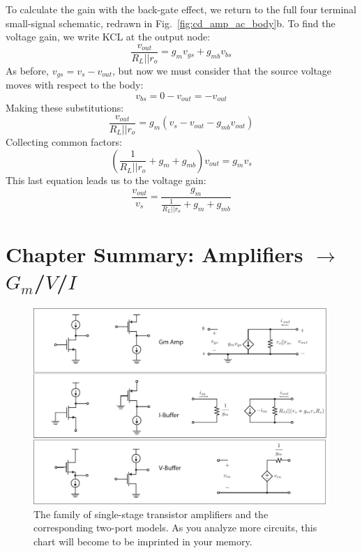 To calculate the gain with the back-gate effect, we return to the full four terminal small-signal schematic, redrawn in Fig.~\ref{fig:cd_amp_ac_body}b.  To find the voltage gain, we write KCL at the output node: 
% 
\begin{equation}
	\frac{{{v_{out}}}}{{{R_L}||{r_o}}} = {g_m}{v_{gs}} + g_{mb} v_{bs} 
\end{equation}
%
As before, $v_{gs} = v_{s} - v_{out}$, but now we must consider that the source voltage moves with respect to the body:
%
\begin{equation}
	v_{bs} = 0 - v_{out} = -v_{out}
\end{equation}
%
Making these substitutions:
%
\begin{equation}
	\frac{{{v_{out}}}}{{{R_L}||{r_o}}} = {g_m}\left( {{v_{s}} - {v_{out}}}  - g_{mb} v_{out} \right)
\end{equation}
%
Collecting common factors:
%
\begin{equation}
	\left( {\frac{1}{{{R_L}||{r_o}}} + {g_m} + g_{mb} } \right){v_{out}} = {g_m}{v_{s}}
\end{equation}
%
This last equation leads us to the voltage gain:
%
\begin{equation}
	\frac{{{v_{out}}}}{{{v_{s}}}} = \frac{{{g_m}}}{{\frac{1}{{{R_L}||{r_o}}} + {g_m} + g_{mb}}}
\end{equation}




\section{Chapter Summary: Amplifiers $\rightarrow$ $G_m$/$V$/$I$}

\begin{figure}[tb]
\begin{center}
\includegraphics[width=\columnwidth]{ampchart_models}
\end{center}
\caption{The family of single-stage transistor amplifiers and the corresponding two-port models.  As you analyze more circuits, this chart will become to be imprinted in your memory.} \label{fig:ampchart_models}
\end{figure}

